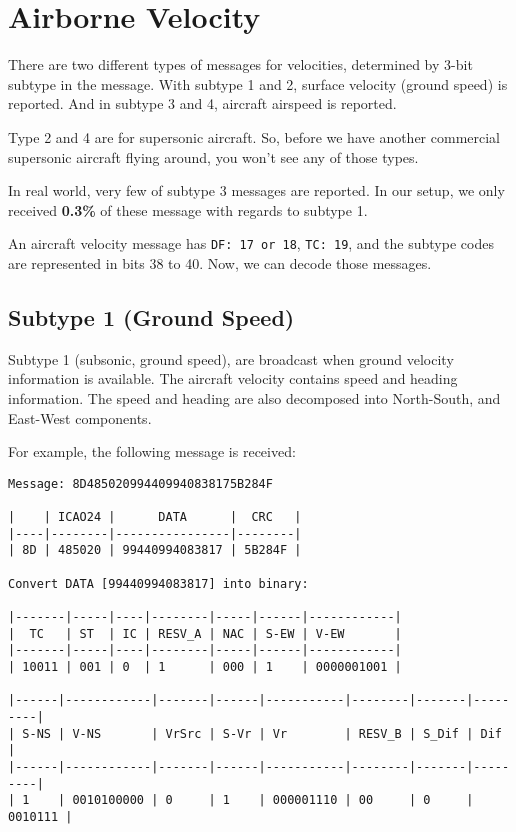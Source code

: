 \section{Airborne Velocity}\label{airborne-velocity}

There are two different types of messages for velocities, determined by
3-bit subtype in the message. With subtype 1 and 2, surface velocity
(ground speed) is reported. And in subtype 3 and 4, aircraft airspeed is
reported.

Type 2 and 4 are for supersonic aircraft. So, before we have another
commercial supersonic aircraft flying around, you won't see any of those
types.

In real world, very few of subtype 3 messages are reported. In our
setup, we only received \textbf{0.3\%} of these message with regards to
subtype 1.

An aircraft velocity message has \texttt{DF:\ 17\ or\ 18},
\texttt{TC:\ 19}, and the subtype codes are represented in bits 38 to
40. Now, we can decode those messages.

\subsection{Subtype 1 (Ground Speed)}\label{subtype-1-ground-speed}

Subtype 1 (subsonic, ground speed), are broadcast when ground velocity
information is available. The aircraft velocity contains speed and
heading information. The speed and heading are also decomposed into
North-South, and East-West components.

For example, the following message is received:

\begin{verbatim}
Message: 8D485020994409940838175B284F

|    | ICAO24 |      DATA      |  CRC   |
|----|--------|----------------|--------|
| 8D | 485020 | 99440994083817 | 5B284F |

Convert DATA [99440994083817] into binary:

|-------|-----|----|--------|-----|------|------------|
|  TC   | ST  | IC | RESV_A | NAC | S-EW | V-EW       |
|-------|-----|----|--------|-----|------|------------|
| 10011 | 001 | 0  | 1      | 000 | 1    | 0000001001 |

|------|------------|-------|------|-----------|--------|-------|---------|
| S-NS | V-NS       | VrSrc | S-Vr | Vr        | RESV_B | S_Dif | Dif     |
|------|------------|-------|------|-----------|--------|-------|---------|
| 1    | 0010100000 | 0     | 1    | 000001110 | 00     | 0     | 0010111 |
\end{verbatim}

